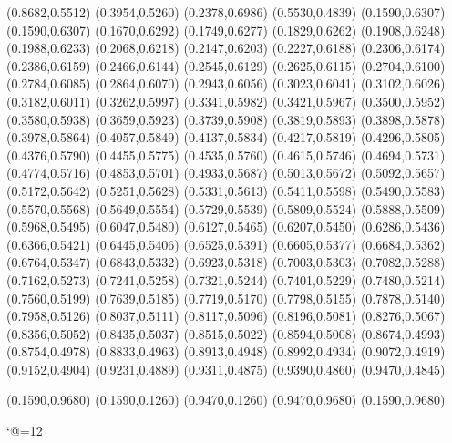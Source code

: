 \PST@Diamond(0.8682,0.5512)
\PST@Diamond(0.3954,0.5260)
\PST@Diamond(0.2378,0.6986)
\PST@Diamond(0.5530,0.4839)
\PST@Dashed(0.1590,0.6307)
(0.1590,0.6307)
(0.1670,0.6292)
(0.1749,0.6277)
(0.1829,0.6262)
(0.1908,0.6248)
(0.1988,0.6233)
(0.2068,0.6218)
(0.2147,0.6203)
(0.2227,0.6188)
(0.2306,0.6174)
(0.2386,0.6159)
(0.2466,0.6144)
(0.2545,0.6129)
(0.2625,0.6115)
(0.2704,0.6100)
(0.2784,0.6085)
(0.2864,0.6070)
(0.2943,0.6056)
(0.3023,0.6041)
(0.3102,0.6026)
(0.3182,0.6011)
(0.3262,0.5997)
(0.3341,0.5982)
(0.3421,0.5967)
(0.3500,0.5952)
(0.3580,0.5938)
(0.3659,0.5923)
(0.3739,0.5908)
(0.3819,0.5893)
(0.3898,0.5878)
(0.3978,0.5864)
(0.4057,0.5849)
(0.4137,0.5834)
(0.4217,0.5819)
(0.4296,0.5805)
(0.4376,0.5790)
(0.4455,0.5775)
(0.4535,0.5760)
(0.4615,0.5746)
(0.4694,0.5731)
(0.4774,0.5716)
(0.4853,0.5701)
(0.4933,0.5687)
(0.5013,0.5672)
(0.5092,0.5657)
(0.5172,0.5642)
(0.5251,0.5628)
(0.5331,0.5613)
(0.5411,0.5598)
(0.5490,0.5583)
(0.5570,0.5568)
(0.5649,0.5554)
(0.5729,0.5539)
(0.5809,0.5524)
(0.5888,0.5509)
(0.5968,0.5495)
(0.6047,0.5480)
(0.6127,0.5465)
(0.6207,0.5450)
(0.6286,0.5436)
(0.6366,0.5421)
(0.6445,0.5406)
(0.6525,0.5391)
(0.6605,0.5377)
(0.6684,0.5362)
(0.6764,0.5347)
(0.6843,0.5332)
(0.6923,0.5318)
(0.7003,0.5303)
(0.7082,0.5288)
(0.7162,0.5273)
(0.7241,0.5258)
(0.7321,0.5244)
(0.7401,0.5229)
(0.7480,0.5214)
(0.7560,0.5199)
(0.7639,0.5185)
(0.7719,0.5170)
(0.7798,0.5155)
(0.7878,0.5140)
(0.7958,0.5126)
(0.8037,0.5111)
(0.8117,0.5096)
(0.8196,0.5081)
(0.8276,0.5067)
(0.8356,0.5052)
(0.8435,0.5037)
(0.8515,0.5022)
(0.8594,0.5008)
(0.8674,0.4993)
(0.8754,0.4978)
(0.8833,0.4963)
(0.8913,0.4948)
(0.8992,0.4934)
(0.9072,0.4919)
(0.9152,0.4904)
(0.9231,0.4889)
(0.9311,0.4875)
(0.9390,0.4860)
(0.9470,0.4845)

\PST@Border(0.1590,0.9680)
(0.1590,0.1260)
(0.9470,0.1260)
(0.9470,0.9680)
(0.1590,0.9680)

\catcode`@=12
\fi
\endpspicture
